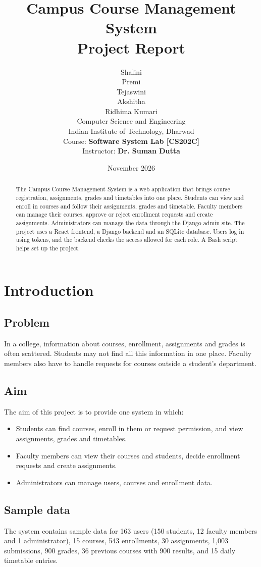 \documentclass[11pt,a4paper]{article}
\title{\textbf{Campus Course Management System}\\[4pt]
Project Report}
\author{
Shalini\\
Premi\\
Tejaswini\\
Akshitha\\
Ridhima Kumari\\[4pt]
Computer Science and Engineering\\
Indian Institute of Technology, Dharwad\\[4pt]
Course: \textbf{Software System Lab [CS202C]}\\
Instructor: \textbf{Dr. Suman Dutta}
}
\date{November 2026}
\begin{document}
\maketitle
\thispagestyle{empty}

\begin{abstract}
The Campus Course Management System is a web application that brings course
registration, assignments, grades and timetables into one place. Students can
view and enroll in courses and follow their assignments, grades and timetable.
Faculty members can manage their courses, approve or reject enrollment requests
and create assignments. Administrators can manage the data through the Django
admin site. The project uses a React frontend, a Django backend and an SQLite
database. Users log in using tokens, and the backend checks the access allowed
for each role. A Bash script helps set up the project.
\end{abstract}

\section{Introduction}

\subsection{Problem}
In a college, information about courses, enrollment, assignments and grades is
often scattered. Students may not find all this information in one place.
Faculty members also have to handle requests for courses outside a student's
department.

\subsection{Aim}
The aim of this project is to provide one system in which:
\begin{itemize}
    \item Students can find courses, enroll in them or request permission, and
    view assignments, grades and timetables.
    \item Faculty members can view their courses and students, decide enrollment
    requests and create assignments.
    \item Administrators can manage users, courses and enrollment data.
\end{itemize}

\subsection{Sample data}
The system contains sample data for 163 users (150 students, 12 faculty members
and 1 administrator), 15 courses, 543 enrollments, 30 assignments, 1,003
submissions, 900 grades, 36 previous courses with 900 results, and 15 daily
timetable entries.
\end{document}
